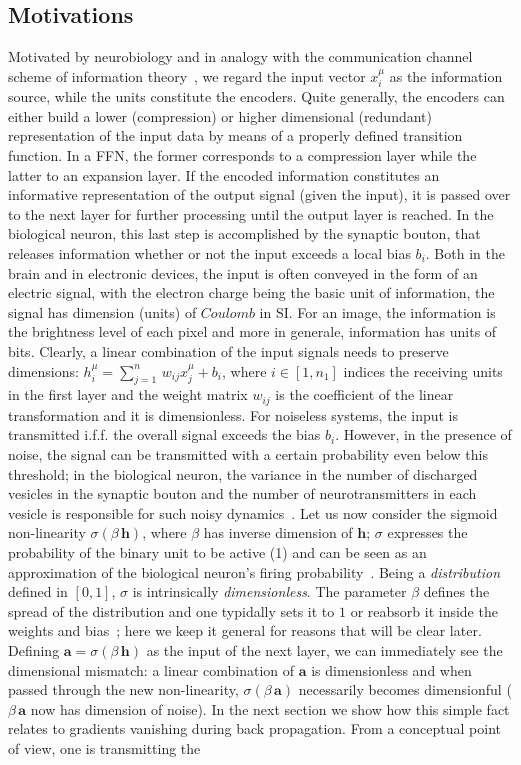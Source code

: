 \documentclass{article}
\begin{document}
\subsection{Motivations} \label{sub:mot}
%
Motivated by neurobiology and in analogy with the communication channel scheme of information theory~\cite{mckay, jaynes}, we regard the input vector $x^{\mu}_i$ as the information source, while the units constitute the encoders. Quite generally, the encoders can either build a lower (compression) or higher dimensional (redundant) representation of the input data by means of a properly defined transition function. In a FFN, the former corresponds to a compression layer while the latter to an expansion layer. If the encoded information constitutes an informative representation of the output signal (given the input), it is passed  over to the next layer for further processing until the output layer is reached. In the biological neuron, this last step is accomplished by the synaptic bouton, that releases information whether or not the input exceeds a local bias $b_i$. Both in the brain and in electronic devices, the input is often conveyed in the form of an electric signal, with the electron charge being the basic unit of information, the signal has dimension (units) of $Coulomb$ in SI. For an image, the information is the brightness level of each pixel and more in generale, information has units of bits. Clearly, a linear combination of the input signals needs to preserve dimensions: $h^{\mu}_i = \sum_{j=1}^{n} \, w_{ij} x^{\mu}_j + b_i$, where $i \in [1, n_1]$ indices the receiving units in the first layer and the weight matrix $ w_{ij}$ is the coefficient of the linear transformation and it is dimensionless. For noiseless systems, the input is transmitted i.f.f. the overall signal exceeds the bias $b_i$. However, in the presence of noise, the signal can be transmitted with a certain probability even below this threshold; in the biological neuron, the variance in the number of discharged vesicles in the synaptic bouton and the number of neurotransmitters in each vesicle is responsible for such noisy dynamics~\cite{amit1}. Let us now consider the sigmoid non-linearity $\sigma(\beta \, \mathbf{h} )$, where $\beta$  has inverse dimension of $\mathbf{h}$;  $\sigma$ expresses the probability of the binary unit to be active (1) and can be seen as an approximation of the biological neuron's firing probability~\cite{amit1}. Being a {\it distribution} defined in $[0,1]$, $\sigma$ is intrinsically {\it dimensionless}. The parameter $\beta$ defines the spread of the distribution and one typidally sets it to $1$ or reabsorb it inside the weights and bias~\cite{zecchina}; here we keep it general for reasons that will be clear later. Defining $\mathbf{a} = \sigma(\beta \, \mathbf{h} )$ as the input of the next layer, we can immediately see the dimensional mismatch: a linear combination of $\mathbf{a}$ is dimensionless and when passed through the new non-linearity, $\sigma(\beta \, \mathbf{a} )$ necessarily becomes dimensionful ($\beta \, \mathbf{a}$ now has dimension of noise). In the next section we show how this simple fact relates to gradients vanishing during back propagation. From a conceptual point of view, one is transmitting the 
\end{document}
